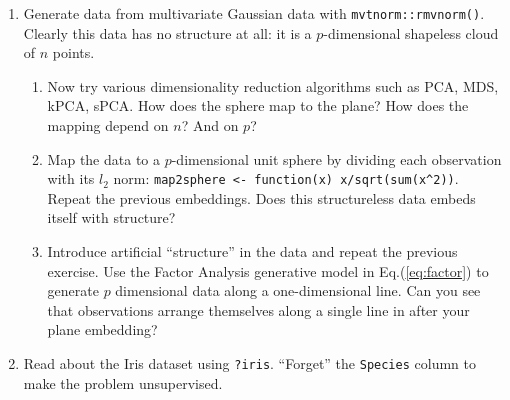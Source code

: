 \documentclass[]{book}
\providecommand{\tightlist}{%
  \setlength{\itemsep}{0pt}\setlength{\parskip}{0pt}}
\theoremstyle{definition}
\theoremstyle{definition}
\theoremstyle{definition}
\theoremstyle{remark}
\begin{document}
\begin{enumerate}
\def\labelenumi{\arabic{enumi}.}
\tightlist
\item
  Generate data from multivariate Gaussian data with
  \texttt{mvtnorm::rmvnorm()}. Clearly this data has no structure at
  all: it is a \(p\)-dimensional shapeless cloud of \(n\) points.

  \begin{enumerate}
  \def\labelenumii{\arabic{enumii}.}
  \tightlist
  \item
    Now try various dimensionality reduction algorithms such as PCA,
    MDS, kPCA, sPCA. How does the sphere map to the plane? How does the
    mapping depend on \(n\)? And on \(p\)?
  \item
    Map the data to a \(p\)-dimensional unit sphere by dividing each
    observation with its \(l_2\) norm:
    \texttt{map2sphere\ \textless{}-\ function(x)\ x/sqrt(sum(x\^{}2))}.
    Repeat the previous embeddings. Does this structureless data embeds
    itself with structure?
  \item
    Introduce artificial ``structure'' in the data and repeat the
    previous exercise. Use the Factor Analysis generative model in
    Eq.(\eqref{eq:factor}) to generate \(p\) dimensional data along a
    one-dimensional line. Can you see that observations arrange
    themselves along a single line in after your plane embedding?
  \end{enumerate}
\item
  Read about the Iris dataset using \texttt{?iris}. ``Forget'' the
  \texttt{Species} column to make the problem unsupervised.


\end{enumerate}
\end{document}
